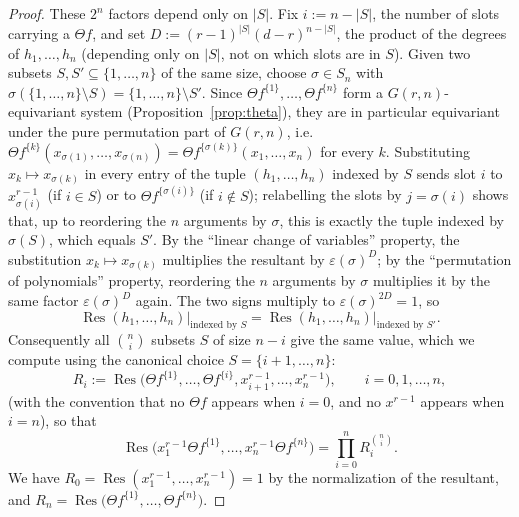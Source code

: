 \documentclass[12pt]{amsart}
\theoremstyle{definition}
\newcommand{\Res}{\operatorname{Res}}
\begin{document}
\begin{proof}
These $2^n$ factors depend only on $|S|$. Fix $i := n-|S|$, the number of slots carrying a $\Theta f$, and set $D := (r-1)^{|S|}(d-r)^{n-|S|}$, the product of the degrees of $h_1,\dots,h_n$ (depending only on $|S|$, not on which slots are in $S$). Given two subsets $S,S'\subseteq\{1,\dots,n\}$ of the same size, choose $\sigma \in S_n$ with $\sigma(\{1,\dots,n\}\setminus S) = \{1,\dots,n\}\setminus S'$. Since $\Theta f^{\{1\}},\dots,\Theta f^{\{n\}}$ form a $G(r,n)$-equivariant system (Proposition~\ref{prop:theta}), they are in particular equivariant under the pure permutation part of $G(r,n)$, i.e.\ $\Theta f^{\{k\}}(x_{\sigma(1)},\dots,x_{\sigma(n)}) = \Theta f^{\{\sigma(k)\}}(x_1,\dots,x_n)$ for every $k$. Substituting $x_k \mapsto x_{\sigma(k)}$ in every entry of the tuple $(h_1,\dots,h_n)$ indexed by $S$ sends slot $i$ to $x_{\sigma(i)}^{r-1}$ (if $i\in S$) or to $\Theta f^{\{\sigma(i)\}}$ (if $i\notin S$); relabelling the slots by $j=\sigma(i)$ shows that, up to reordering the $n$ arguments by $\sigma$, this is exactly the tuple indexed by $\sigma(S)$, which equals $S'$. By the ``linear change of variables'' property, the substitution $x_k \mapsto x_{\sigma(k)}$ multiplies the resultant by $\varepsilon(\sigma)^D$; by the ``permutation of polynomials'' property, reordering the $n$ arguments by $\sigma$ multiplies it by the same factor $\varepsilon(\sigma)^D$ again. The two signs multiply to $\varepsilon(\sigma)^{2D}=1$, so
\[
\Res(h_1,\dots,h_n)\big|_{\text{indexed by }S} = \Res(h_1,\dots,h_n)\big|_{\text{indexed by }S'}.
\]
Consequently all $\binom{n}{i}$ subsets $S$ of size $n-i$ give the same value, which we compute using the canonical choice $S=\{i+1,\dots,n\}$:
\[
R_i := \Res\big(\Theta f^{\{1\}},\dots,\Theta f^{\{i\}}, x_{i+1}^{r-1},\dots,x_n^{r-1}\big), \qquad i=0,1,\dots,n,
\]
(with the convention that no $\Theta f$ appears when $i=0$, and no $x^{r-1}$ appears when $i=n$), so that
\[
\Res\big(x_1^{r-1}\Theta f^{\{1\}},\dots,x_n^{r-1}\Theta f^{\{n\}}\big) = \prod_{i=0}^n R_i^{\binom{n}{i}}.
\]
We have $R_0 = \Res(x_1^{r-1},\dots,x_n^{r-1}) = 1$ by the normalization of the resultant, and $R_n = \Res\big(\Theta f^{\{1\}},\dots,\Theta f^{\{n\}}\big)$.


\end{proof}
\end{document}
